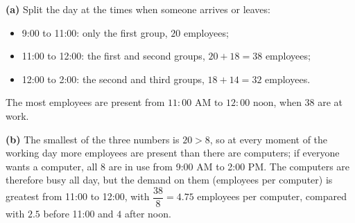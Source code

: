 \textbf{(a)} Split the day at the times when someone arrives or leaves:
\begin{itemize}
\item 9:00 to 11:00: only the first group, $20$ employees;
\item 11:00 to 12:00: the first and second groups, $20+18=38$ employees;
\item 12:00 to 2:00: the second and third groups, $18+14=32$ employees.
\end{itemize}
The most employees are present from $\boxed{11{:}00\text{ AM to }12{:}00\text{ noon}}$, when $38$ are at work.

\textbf{(b)} The smallest of the three numbers is $20>8$, so at every moment of the working day more employees are present than there are computers; if everyone wants a computer, all $8$ are in use from 9:00 AM to 2:00 PM. The computers are therefore busy all day, but the demand on them (employees per computer) is greatest from 11:00 to 12:00, with $\dfrac{38}{8}=4.75$ employees per computer, compared with $2.5$ before 11:00 and $4$ after noon.
